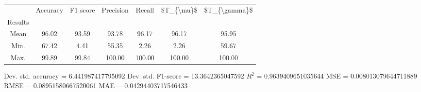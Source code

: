 \begin{tabular}{|c|c|c|c|c|c|c|}
\toprule
{} &  Accuracy &  F1 score &  Precision &  Recall &  \$T\_\{\textbackslash mu\}\$ &  \$T\_\{\textbackslash gamma\}\$ \\
Results &           &           &            &         &            &               \\
\hline
Mean    &     96.02 &     93.59 &      93.78 &   96.17 &      96.17 &         95.95 \\
Min.    &     67.42 &      4.41 &      55.35 &    2.26 &       2.26 &         59.67 \\
Max.    &     99.89 &     99.84 &     100.00 &  100.00 &     100.00 &        100.00 \\
\bottomrule
\end{tabular}

 Dev. std. accuracy = 6.441987417795092
 Dev. std. F1-score = 13.3642365047592
 $R^2$ = 0.9639409651035644
 MSE = 0.008013079644711889
 RMSE = 0.08951580667520061
 MAE = 0.04294403717546433